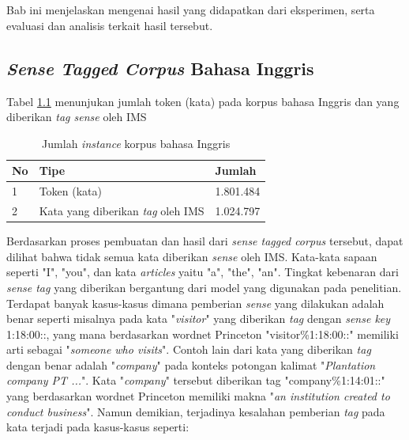 \chapter{\babLima}
Bab ini menjelaskan mengenai hasil yang didapatkan dari eksperimen, serta evaluasi dan analisis terkait hasil tersebut.

\section{\textit{Sense Tagged Corpus} Bahasa Inggris}
Tabel \ref{table:sense-tagged-corpus} menunjukan jumlah token (kata) pada korpus bahasa Inggris dan yang diberikan \textit{tag sense} oleh IMS

\begin{table}
	\centering
	\caption{Jumlah \textit{instance} korpus bahasa Inggris}
	\label{table:sense-tagged-corpus}
	\begin{tabular}{|p{0.7cm}|p{4cm}|p{4cm}|}
		\hline
		No & Tipe & Jumlah
		\\ \hline
		1    & 
		Token (kata)   & 
		1.801.484
		\\ \hline
		2    & 
		Kata yang diberikan \textit{tag} oleh IMS     & 
		1.024.797 
		\\ \hline
	\end{tabular}
\end{table}

Berdasarkan proses pembuatan dan hasil dari \textit{sense tagged corpus} tersebut, dapat dilihat bahwa tidak semua kata diberikan \textit{sense} oleh IMS. Kata-kata sapaan seperti "I", "you", dan kata \textit{articles} yaitu "a", "the", "an". Tingkat kebenaran dari \textit{sense tag} yang diberikan bergantung dari model yang digunakan pada penelitian. Terdapat banyak kasus-kasus dimana pemberian \textit{sense} yang dilakukan adalah benar seperti misalnya pada kata "\textit{visitor}" yang diberikan \textit{tag} dengan \textit{sense key} 1:18:00::, yang mana berdasarkan wordnet Princeton "visitor\%1:18:00::" memiliki arti sebagai "\textit{someone who visits}". Contoh lain dari kata yang diberikan \textit{tag} dengan benar adalah "\textit{company}" pada konteks potongan kalimat "\textit{Plantation company PT ...}". Kata "\textit{company}" tersebut diberikan tag "company\%1:14:01::" yang berdasarkan wordnet Princeton memiliki makna "\textit{an institution created to conduct business}". Namun demikian, terjadinya kesalahan pemberian \textit{tag} pada kata terjadi pada kasus-kasus seperti: 

